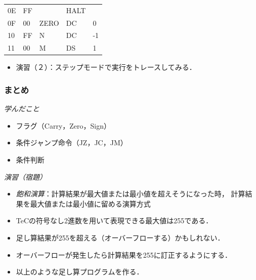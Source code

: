 \documentclass{beamer}                 %
\begin{document}
\begin{frame}
\begin{minipage}{0.5\columnwidth}
{\begin{center}
\begin{tabular}{|l|l|l|l l|}
        0E & FF    &      & HALT &         \\
        0F & 00    & ZERO & DC   & 0       \\
        10 & FF    & N    & DC   & -1      \\
        11 & 00    & M    & DS   & 1       \\
        \hline
      \end{tabular}
    \end{center}}
  \end{minipage}
  \vfill
  \begin{itemize}
  \item 演習（２）：ステップモードで実行をトレースしてみる．
  \end{itemize}
\end{frame}

\begin{frame}
  \frametitle{まとめ}
  \emph{学んだこと}
  \begin{itemize}
  \item フラグ（Carry，Zero，Sign）
  \item 条件ジャンプ命令（JZ，JC，JM）
  \item 条件判断
  \end{itemize}
  \vfill

  \emph{演習（宿題）}
  \begin{itemize}
  \item \emph{飽和演算}：計算結果が最大値または最小値を超えそうになった時，
    計算結果を最大値または最小値に留める演算方式
  \item TeCの符号なし2進数を用いて表現できる最大値は255である．
  \item 足し算結果が255を超える（オーバーフローする）かもしれない．
  \item オーバーフローが発生したら計算結果を255に訂正するようにする．
  \item 以上のような足し算プログラムを作る．
  \end{itemize}
  \vfill
\end{frame}
\end{document}

